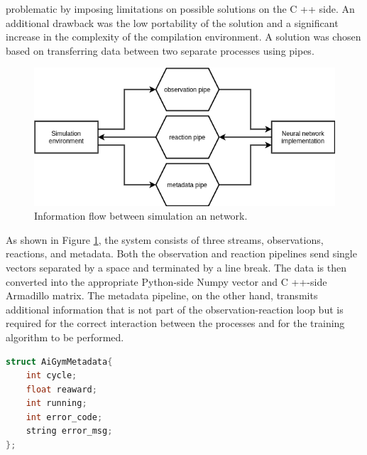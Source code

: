 problematic by imposing limitations on possible solutions on the C ++ side. 
An additional drawback was the low portability of the solution and a significant increase in the 
complexity of the compilation environment. 
A solution was chosen based on transferring data between two separate processes using pipes.
\begin{figure}[htb] 
	\label{fig:experiment_pipes}
	\centering
	\includegraphics[width=\textwidth]{figures/experiment_pipes}
	\caption{Information flow between simulation an network.}
\end{figure}

As shown in Figure \ref{fig:experiment_pipes}, the system consists of three streams, 
observations, reactions, and metadata. 
Both the observation and reaction pipelines send single vectors separated by a space and terminated
by a line break. 
The data is then converted into the appropriate Python-side Numpy vector and C ++-side Armadillo 
matrix. 
The metadata pipeline, on the other hand, transmits additional information that is not part of 
the observation-reaction loop but is required for the correct interaction between the processes 
and for the training algorithm to be performed.
\begin{lstlisting}[language=C]
struct AiGymMetadata{
	int cycle;
	float reaward;
	int running;
	int error_code;
	string error_msg;
};
\end{lstlisting}

